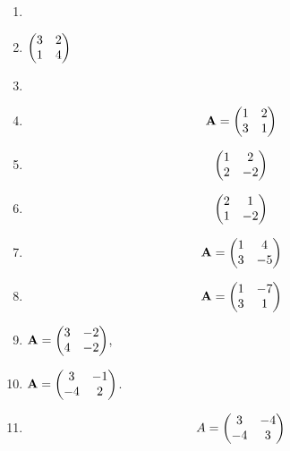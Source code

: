 \documentclass[journal,12pt,twocolumn]{IEEEtran}
\renewcommand\thesection{\arabic{section}}
\begin{document}
\begin{enumerate}[label=\thesection.\arabic*.,ref=\thesection.\theenumi]
\item  {}
\\
%
\item   $\begin{pmatrix} 3&2\\1&4\end{pmatrix}$ 
\\
%
%
\item   {}
\\
%
%
\item 
\begin{align}
 \mathbf{A}=\begin{pmatrix} 1&2\\3&1\end{pmatrix}
\end{align}
%
\item   
\begin{align}
    \begin{pmatrix} 1&2\\2&-2\end{pmatrix}
\end{align}
%
%
\item 
\begin{align}
    \begin{pmatrix} 2&1\\1&-2\end{pmatrix}
\end{align}
%
%
\item 
\begin{align}
    \mathbf{A}=\begin{pmatrix}  1 & 4 \\ 3 & -5 \end{pmatrix}\label{eq:solutions/decomp/2/21/givmat}
\end{align}
%
%
\item  
\begin{align}
    \mathbf{A}=\begin{pmatrix}  1 & -7 \\ 3 & 1 \end{pmatrix}\label{eq:solutions/decomp/2/22/givmat}
\end{align}
%
%
\item  $\mathbf{A} = \begin{pmatrix} 3 & -2\\4 & -2\end{pmatrix}$, 
%
%
\item   $\mathbf{A}=\begin{pmatrix} 3&-1\\-4&2\end{pmatrix}$.
%
\item 
\begin{align*}
	A = \begin{pmatrix} 3 & -4 \\ -4 & 3\end{pmatrix} 
\end{align*}


\end{enumerate}
\end{document}
